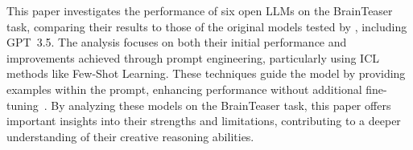 This paper investigates the performance of six open \acp{LLM} on the BrainTeaser task, comparing their results to those of the original models tested by \textcite{jiangBRAINTEASERLateralThinking2023}, including \acs{GPT}~3.5. The analysis focuses on both their initial performance and improvements achieved through prompt engineering, particularly using \ac{ICL} methods like Few-Shot Learning. These techniques guide the model by providing examples within the prompt, enhancing performance without additional fine-tuning~\cite{yinDeeperInsightsUpdates2024,brownLanguageModelsAre2020}. By analyzing these models on the BrainTeaser task, this paper offers important insights into their strengths and limitations, contributing to a deeper understanding of their creative reasoning abilities.
